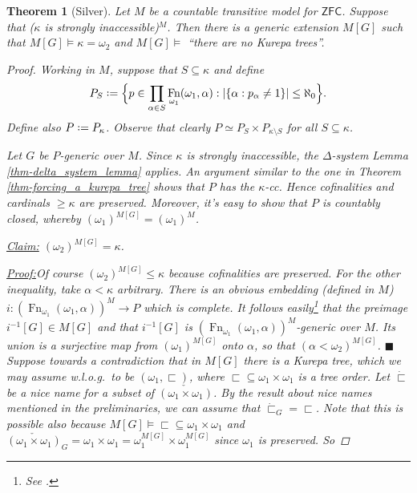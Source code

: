 \documentclass[11pt,a4paper]{report}
\newtheorem{theorem}{Theorem}[chapter] %
\theoremstyle{definition}
\theoremstyle{num.custom-title}
\theoremstyle{custom-title}
\newenvironment{claim}[1]{\par\noindent\underline{Claim#1:}\space}{} %
\newenvironment{claimproof}[1]{\par\noindent\underline{Proof:}\space#1}{\leavevmode\unskip\penalty9999 \hbox{}\nobreak\hfill\quad\hbox{$\blacksquare$}} %
\DeclareMathOperator{\sm}{\setminus}
\DeclareMathOperator{\sse}{\subseteq}
\DeclareMathOperator{\Fn}{Fn}
\newcommand{\ZFC}{\ensuremath{\mathsf{ZFC}}\xspace}
\newcommand*{\defeq}{\mathrel{\rlap{%
                     \raisebox{0.3ex}{$\cdot$}}%
                     \raisebox{-0.3ex}{$\cdot$}}%
                     =}
\begin{document}
\begin{theorem}[Silver]\label{thm-killing_kurepa_trees_via_forcing}
\newcommand{\supt}{\operatorname{supt}}
Let $M$ be a countable transitive model for \ZFC. Suppose that ($\kappa$ is strongly inaccessible)$^M$. Then there is a generic extension $M[G]$ such that $M[G] \models \kappa = \omega_2$ and $M[G] \models$ ``there are no Kurepa trees''.
\begin{proof}
Working in $M$, suppose that $S \sse \kappa$ and define
\[
P_S \defeq \Big\{ p \in \prod_{\alpha \in S} \Fn_{\omega_1} (\omega_1, \alpha) : |\{ \alpha : p_\alpha \neq 1 \}| \leq \aleph_0 \Big\}.
\]
Define also $P \defeq P_\kappa$. Observe that clearly $P \simeq P_S \times P_{\kappa \sm S}$ for all $S \sse \kappa$.

Let $G$ be $P$-generic over $M$. Since $\kappa$ is strongly inaccessible, the $\Delta$-system Lemma \ref{thm-delta_system_lemma} applies. An argument similar to the one in Theorem \ref{thm-forcing_a_kurepa_tree} shows that $P$ has the $\kappa$-cc. Hence cofinalities and cardinals $\geq \kappa$ are preserved. Moreover, it's easy to show that $P$ is countably closed, whereby $(\omega_1)^{M[G]} = (\omega_1)^M$.
\begin{claim}{}
$(\omega_2)^{M[G]} = \kappa$.
\begin{claimproof}
Of course $(\omega_2)^{M[G]} \leq \kappa$ because cofinalities are preserved. For the other inequality, take $\alpha < \kappa$ arbitrary. There is an obvious embedding (defined in $M$) $i \colon (\Fn_{\omega_1} (\omega_1,\alpha))^M \to P$ which is complete. It follows easily\footnote{See \cite[Lemma IV.4.2, p.\ 270]{Kun2013}.} that the preimage $i^{-1}[G] \in M[G]$ and that $i^{-1}[G]$ is $(\Fn_{\omega_1} (\omega_1,\alpha))^M$-generic over $M$. Its union is a surjective map from $(\omega_1)^{M[G]}$ onto $\alpha$, so that $(\alpha < \omega_2)^{M[G]}$.
\end{claimproof}
\end{claim}\\[6pt]
%
\indent Suppose towards a contradiction that in $M[G]$ there is a Kurepa tree, which we may assume w.l.o.g.\ to be $(\omega_1, \sqsubset)$, where ${\sqsubset} \sse \omega_1 \times \omega_1$ is a tree order. Let $\dot{\sqsubset}$ be a nice name for a subset of $\check{(\omega_1 \times \omega_1)}$. By the result about nice names mentioned in the preliminaries, we can assume that ${\dot{\sqsubset}_G} = {\sqsubset}$. Note that this is possible also because $M[G] \models {\sqsubset} \sse \omega_1 \times \omega_1$ and $\check{(\omega_1 \times \omega_1)}_G = \omega_1 \times \omega_1 = \omega_1^{M[G]} \times \omega_1^{M[G]}$ since $\omega_1$ is preserved. So

\end{proof}
\end{theorem}
\end{document}
